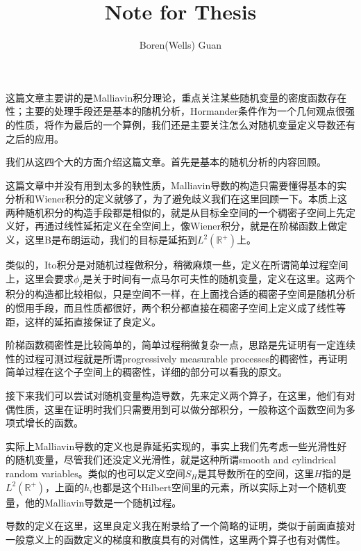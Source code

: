 \documentclass[lang=cn,11pt,a4paper,citestyle =authoryear]{elegantpaper}
\title{Note for Thesis}
\author{Boren(Wells) Guan}
\newcommand{\R}{\mathbb{R}}
\begin{document}
\maketitle

这篇文章主要讲的是Malliavin积分理论，重点关注某些随机变量的密度函数存在性；主要的处理手段还是基本的随机分析，Hormander条件作为一个几何观点很强的性质，将作为最后的一个算例，我们还是主要关注怎么对随机变量定义导数还有之后的应用。\par

我们从这四个大的方面介绍这篇文章。首先是基本的随机分析的内容回顾。\par

这篇文章中并没有用到太多的鞅性质，Malliavin导数的构造只需要懂得基本的实分析和Wiener积分的定义就够了，为了避免歧义我们在这里回顾一下。本质上这两种随机积分的构造手段都是相似的，就是从目标全空间的一个稠密子空间上先定义好，再通过线性延拓定义在全空间上，像Wiener积分，就是在阶梯函数上做定义，这里B是布朗运动，我们的目标是延拓到$L^2(\R^+)$上。\par

类似的，Ito积分是对随机过程做积分，稍微麻烦一些，定义在所谓简单过程空间上，这里会要求$\phi_j$是关于时间有一点马尔可夫性的随机变量，定义在这里。这两个积分的构造都比较相似，只是空间不一样，在上面找合适的稠密子空间是随机分析的惯用手段，而且性质都很好，两个积分都直接在稠密子空间上定义成了线性等距，这样的延拓直接保证了良定义。\par

阶梯函数稠密性是比较简单的，简单过程稍微复杂一点，思路是先证明有一定连续性的过程可测过程就是所谓progressively measurable processes的稠密性，再证明简单过程在这个子空间上的稠密性，详细的部分可以看我的原文。\par

接下来我们可以尝试对随机变量构造导数，先来定义两个算子，在这里，他们有对偶性质，这里在证明时我们只需要用到可以做分部积分，一般称这个函数空间为多项式增长的函数。\par

实际上Malliavin导数的定义也是靠延拓实现的，事实上我们先考虑一些光滑性好的随机变量，尽管我们还没定义光滑性，就是这种所谓smooth and cylindrical random variables。类似的也可以定义空间$S_H$是其导数所在的空间，这里$H$指的是$L^2(\R^+)$，上面的$h_i$也都是这个Hilbert空间里的元素，所以实际上对一个随机变量，他的Malliavin导数是一个随机过程。\par

导数的定义在这里，这里良定义我在附录给了一个简略的证明，类似于前面直接对一般意义上的函数定义的梯度和散度具有的对偶性，这里两个算子也有对偶性。\par
\end{document}
